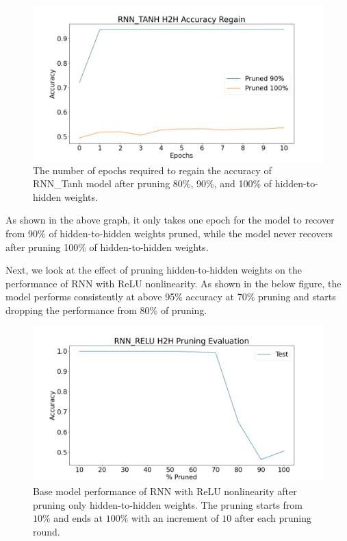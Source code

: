\begin{figure}[H]
	\centering
	\includegraphics[width=0.8\linewidth]{images/results/pruning_h2h/rnn_tanh_h2h_accuracy_regain.png}
	\caption[RNN\_Tanh base model performance regain after pruning h2h weights]%
	{The number of epochs required to regain the accuracy of RNN\_Tanh model after pruning 80\%, 90\%, and 100\% of hidden-to-hidden weights.}
	\label{fig:rnn_tanh_h2h_prune_regain}
\end{figure}

As shown in the above graph, it only takes one epoch for the model to recover from 90\% of hidden-to-hidden weights pruned, while the model never recovers after pruning 100\% of hidden-to-hidden weights.

Next, we look at the effect of pruning hidden-to-hidden weights on the performance of RNN with ReLU nonlinearity. As shown in the below figure, the model performs consistently at above 95\% accuracy at 70\% pruning and starts dropping the performance from 80\% of pruning.

\begin{figure}[h]
	\centering
	\includegraphics[width=0.8\linewidth]{images/results/pruning_h2h/rnn_relu_h2h_pruning_evaluation.png}
	\caption[RNN\_ReLU base model performance after pruning h2h weights]%
	{Base model performance of RNN with ReLU nonlinearity after pruning only hidden-to-hidden weights. The pruning starts from $10\%$ and ends at $100\%$ with an increment of $10$ after each pruning round.}
	\label{fig:rnn_relu_h2h_prune}
\end{figure}

